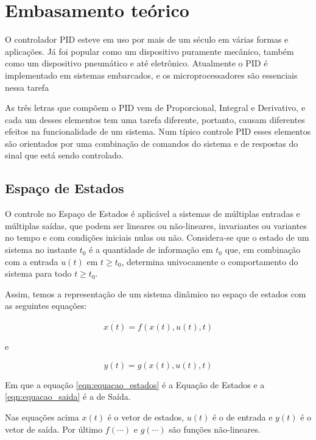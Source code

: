 \documentclass[
	12pt,				%
	openany,			%
	oneside,			%
	a4paper,			%
	english,			%
	french,				%
	spanish,			%
	brazil,				%
	]{abntex2}
\begin{document}
{%
\chapter{Embasamento teórico}

O controlador PID esteve em uso por mais de um século em várias formas e aplicações. Já foi popular como um dispositivo puramente mecânico, também como um dispositivo pneumático e até eletrônico. Atualmente o PID é implementado em sistemas embarcados, e os microprocessadores são essenciais nessa tarefa \cite{timwescott1}

As três letras que compõem o PID vem de Proporcional, Integral e Derivativo, e cada um desses elementos tem uma tarefa diferente, portanto, causam diferentes efeitos na funcionalidade de um sistema. Num típico controle PID esses elementos são orientados por uma combinação de comandos do sistema e de respostas do sinal que está sendo controlado.


\section{Espaço de Estados}

O controle no Espaço de Estados é aplicável a sistemas de múltiplas entradas e múltiplas saídas, que podem ser lineares ou não-lineares, invariantes ou variantes no tempo e com condições iniciais nulas ou não. Considera-se que o estado de um sistema no instante $t_0$ é a quantidade de informação em $t_0$ que, em combinação com a entrada $u(t)$ em $t \geq t_0$, determina univocamente o comportamento do sistema para todo $t \geq t_0$.

Assim, temos a representação de um sistema dinâmico no espaço de estados com as seguintes equações:

\begin{equation}
	\dot{x(t)} = f(x(t), u(t),t)
	\label{eqn:equacao_estados}
\end{equation}

e

\begin{equation}
	y(t) = g(x(t), u(t),t)
	\label{eqn:equacao_saida}
\end{equation}

Em que a equação \ref{eqn:equacao_estados} é a Equação de Estados e a \ref{eqn:equacao_saida} é a de Saída.

Nas equações acima $x(t)$ é o vetor de estados, $u(t)$ é o de entrada e $y(t)$ é o vetor de saída. Por último $f(\cdots)$ e $g(\cdots)$ são funções não-lineares.

}
\end{document}
